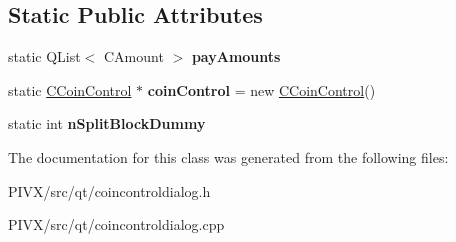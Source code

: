 \subsection*{Static Public Attributes}
\begin{DoxyCompactItemize}
\item 
\mbox{\label{class_coin_control_dialog_af4dd184087c7b34ac68392bec2968d15}} 
static Q\+List$<$ C\+Amount $>$ {\bfseries pay\+Amounts}
\item 
\mbox{\label{class_coin_control_dialog_a9d4514c4fbb1fe19cb3aa121da083bc7}} 
static \mbox{\hyperlink{class_c_coin_control}{C\+Coin\+Control}} $\ast$ {\bfseries coin\+Control} = new \mbox{\hyperlink{class_c_coin_control}{C\+Coin\+Control}}()
\item 
\mbox{\label{class_coin_control_dialog_ab50787868662bb57b74e298e2c6fe7de}} 
static int {\bfseries n\+Split\+Block\+Dummy}
\end{DoxyCompactItemize}


The documentation for this class was generated from the following files\+:\begin{DoxyCompactItemize}
\item 
P\+I\+V\+X/src/qt/coincontroldialog.\+h\item 
P\+I\+V\+X/src/qt/coincontroldialog.\+cpp\end{DoxyCompactItemize}
